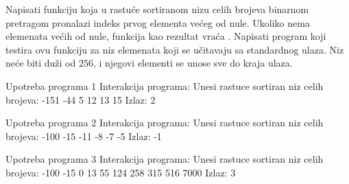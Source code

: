 \begin{Answer}[ref=406]
\end{Answer}
\begin{Exercise}[label=407]
Napisati funkciju koja u rastuće sortiranom nizu celih brojeva
binarnom pretragom pronalazi indeks prvog elementa većeg od nule. Ukoliko nema elemenata
većih od nule, funkcija kao rezultat vraća . Napisati
program koji testira ovu funkciju za niz elemenata koji se
učitavaju sa standardnog ulaza. Niz neće biti duži od
$256$, i njegovi elementi se unose sve do kraja ulaza.

\begin{minitest}
\begin{test}{Upotreba programa 1}
Interakcija programa:
  Unesi rastuce sortiran
  niz celih brojeva:
  -151 -44 5 12 13 15
Izlaz:
  2
\end{test}
\end{minitest}
\begin{minitest}
\begin{test}{Upotreba programa 2}
Interakcija programa:
  Unesi rastuce sortiran
  niz celih brojeva:
  -100 -15 -11 -8 -7 -5
Izlaz:
  -1
\end{test}
\end{minitest}
\begin{minitest}
\begin{test}{Upotreba programa 3}
Interakcija programa:
  Unesi rastuce sortiran
  niz celih brojeva:
  -100 -15 0 13 55 124
  258 315 516 7000
Izlaz:
  3
\end{test}
\end{minitest}


\end{Exercise}
\begin{Answer}[ref=407]
\end{Answer}
